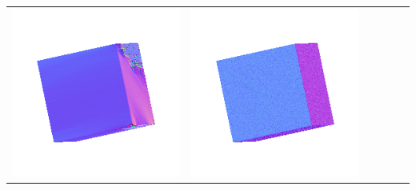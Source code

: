 \begin{center}
\begin{tabularx}{\linewidth}{@{}Y@{}Y@{}Y@{}Y@{}Y@{}Y@{}}
\includegraphics[width=\linewidth]{semisynthetic/20150514_0_yu_out.png} &
\includegraphics[width=\linewidth]{semisynthetic/20150514_0_dpsn_out.png} &

\end{tabularx}
\end{center}
